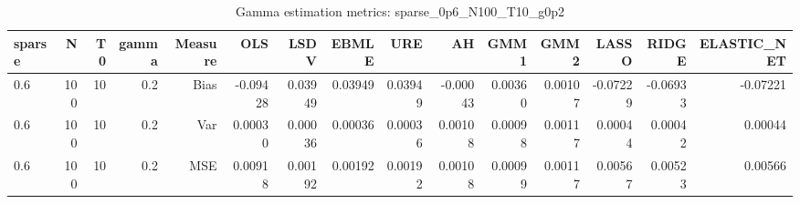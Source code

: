 \begin{table}[!htbp]\centering
\caption{Gamma estimation metrics: sparse_0p6_N100_T10_g0p2}
\label{tab:table1_sparse_0p6_N100_T10_g0p2}
\begin{tabular}{lrrrrrrrrrrrrrr}
\hline
sparse & N & T0 & gamma & Measure & OLS & LSDV & EBMLE & URE & AH & GMM1 & GMM2 & LASSO & RIDGE & ELASTIC_NET \\
\hline
0.6 & 100 & 10 & 0.2 & Bias & -0.09428 & 0.03949 & 0.03949 & 0.03949 & -0.00043 & 0.00360 & 0.00107 & -0.07229 & -0.06933 & -0.07221 \\
0.6 & 100 & 10 & 0.2 & Var & 0.00030 & 0.00036 & 0.00036 & 0.00036 & 0.00108 & 0.00098 & 0.00117 & 0.00044 & 0.00042 & 0.00044 \\
0.6 & 100 & 10 & 0.2 & MSE & 0.00918 & 0.00192 & 0.00192 & 0.00192 & 0.00108 & 0.00099 & 0.00117 & 0.00567 & 0.00523 & 0.00566 \\
\hline
\end{tabular}
\end{table}

